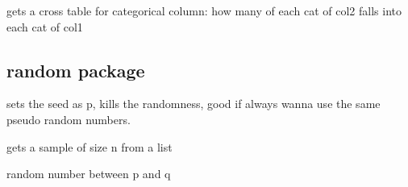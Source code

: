 			 gets a cross table for categorical column: how many of each cat of col2 falls into each cat of col1


	\subsection{random package}


		 sets the seed as p, kills the randomness, good if always wanna use the same pseudo random numbers.

		 gets a sample of size n from a list

		 random number between p and q

